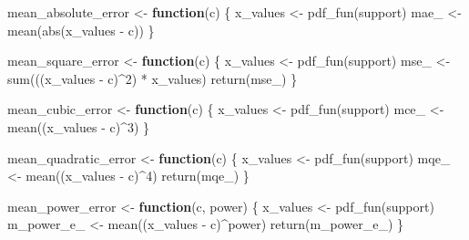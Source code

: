 \documentclass[
]{book}
\newenvironment{Shaded}{\begin{snugshade}}{\end{snugshade}}
\newcommand{\ControlFlowTok}[1]{\textcolor[rgb]{0.13,0.29,0.53}{\textbf{#1}}}
\newcommand{\DecValTok}[1]{\textcolor[rgb]{0.00,0.00,0.81}{#1}}
\newcommand{\FunctionTok}[1]{\textcolor[rgb]{0.00,0.00,0.00}{#1}}
\newcommand{\NormalTok}[1]{#1}
\newcommand{\OtherTok}[1]{\textcolor[rgb]{0.56,0.35,0.01}{#1}}
\newcommand{\SpecialCharTok}[1]{\textcolor[rgb]{0.00,0.00,0.00}{#1}}
\theoremstyle{definition}
\theoremstyle{definition}
\theoremstyle{definition}
\theoremstyle{definition}
\theoremstyle{remark}
\begin{document}
\begin{Shaded}
\begin{Highlighting}[]
\NormalTok{mean\_absolute\_error }\OtherTok{\textless{}{-}} \ControlFlowTok{function}\NormalTok{(c) \{ }
\NormalTok{  x\_values }\OtherTok{\textless{}{-}} \FunctionTok{pdf\_fun}\NormalTok{(support)}
\NormalTok{  mae\_     }\OtherTok{\textless{}{-}} \FunctionTok{mean}\NormalTok{(}\FunctionTok{abs}\NormalTok{(x\_values }\SpecialCharTok{{-}}\NormalTok{ c))}
\NormalTok{\}}

\NormalTok{mean\_square\_error }\OtherTok{\textless{}{-}} \ControlFlowTok{function}\NormalTok{(c) \{ }
\NormalTok{  x\_values }\OtherTok{\textless{}{-}} \FunctionTok{pdf\_fun}\NormalTok{(support)}
\NormalTok{  mse\_     }\OtherTok{\textless{}{-}} \FunctionTok{sum}\NormalTok{(((x\_values }\SpecialCharTok{{-}}\NormalTok{ c)}\SpecialCharTok{\^{}}\DecValTok{2}\NormalTok{) }\SpecialCharTok{*}\NormalTok{ x\_values)}
  \FunctionTok{return}\NormalTok{(mse\_)}
\NormalTok{\}}

\NormalTok{mean\_cubic\_error }\OtherTok{\textless{}{-}} \ControlFlowTok{function}\NormalTok{(c) \{ }
\NormalTok{  x\_values }\OtherTok{\textless{}{-}} \FunctionTok{pdf\_fun}\NormalTok{(support) }
\NormalTok{  mce\_     }\OtherTok{\textless{}{-}} \FunctionTok{mean}\NormalTok{((x\_values }\SpecialCharTok{{-}}\NormalTok{ c)}\SpecialCharTok{\^{}}\DecValTok{3}\NormalTok{)}
\NormalTok{\}}

\NormalTok{mean\_quadratic\_error }\OtherTok{\textless{}{-}} \ControlFlowTok{function}\NormalTok{(c) \{ }
\NormalTok{  x\_values }\OtherTok{\textless{}{-}} \FunctionTok{pdf\_fun}\NormalTok{(support)}
\NormalTok{  mqe\_     }\OtherTok{\textless{}{-}} \FunctionTok{mean}\NormalTok{((x\_values }\SpecialCharTok{{-}}\NormalTok{ c)}\SpecialCharTok{\^{}}\DecValTok{4}\NormalTok{)}
  \FunctionTok{return}\NormalTok{(mqe\_)}
\NormalTok{\}}

\NormalTok{mean\_power\_error }\OtherTok{\textless{}{-}} \ControlFlowTok{function}\NormalTok{(c, power) \{ }
\NormalTok{  x\_values }\OtherTok{\textless{}{-}} \FunctionTok{pdf\_fun}\NormalTok{(support)}
\NormalTok{  m\_power\_e\_     }\OtherTok{\textless{}{-}} \FunctionTok{mean}\NormalTok{((x\_values }\SpecialCharTok{{-}}\NormalTok{ c)}\SpecialCharTok{\^{}}\NormalTok{power)}
  \FunctionTok{return}\NormalTok{(m\_power\_e\_)}
\NormalTok{\}}
\end{Highlighting}
\end{Shaded}
\end{document}
